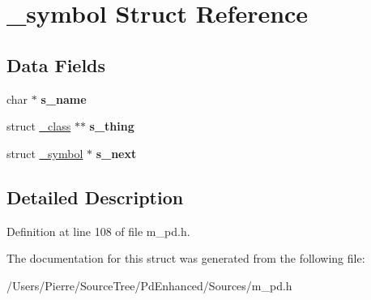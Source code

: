 \hypertarget{struct__symbol}{\section{\-\_\-symbol Struct Reference}
\label{struct__symbol}
}
\subsection*{Data Fields}
\begin{DoxyCompactItemize}
\item 
\hypertarget{struct__symbol_a6c480a00c7475fce44b4175337e1bd6b}{char $\ast$ {\bfseries s\-\_\-name}}\label{struct__symbol_a6c480a00c7475fce44b4175337e1bd6b}

\item 
\hypertarget{struct__symbol_a7595b2e847944a2233e371c38857275f}{struct \hyperlink{struct__class}{\-\_\-class} $\ast$$\ast$ {\bfseries s\-\_\-thing}}\label{struct__symbol_a7595b2e847944a2233e371c38857275f}

\item 
\hypertarget{struct__symbol_ad222ee633bd80a4166b5c4a36212fa8e}{struct \hyperlink{struct__symbol}{\-\_\-symbol} $\ast$ {\bfseries s\-\_\-next}}\label{struct__symbol_ad222ee633bd80a4166b5c4a36212fa8e}

\end{DoxyCompactItemize}


\subsection{Detailed Description}


Definition at line 108 of file m\-\_\-pd.\-h.



The documentation for this struct was generated from the following file\-:\begin{DoxyCompactItemize}
\item 
/\-Users/\-Pierre/\-Source\-Tree/\-Pd\-Enhanced/\-Sources/m\-\_\-pd.\-h\end{DoxyCompactItemize}
